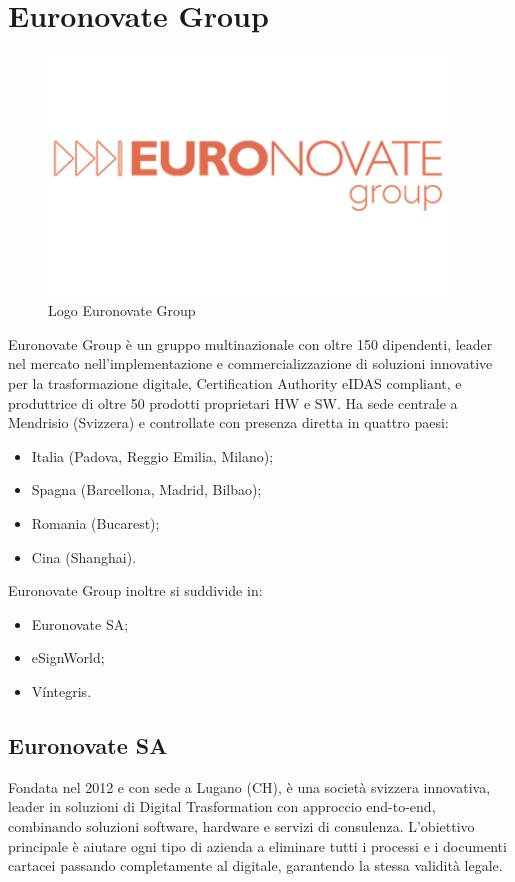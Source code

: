 \section{Euronovate Group}
\begin{figure}[!h] 
    \centering 
    \includegraphics[width=300pt]{images/euronovateGroupLogo.png} 
    \caption{Logo Euronovate Group}
    \label{fig:euronovateLogo}
\end{figure}
Euronovate Group è un gruppo multinazionale con oltre 150 dipendenti, leader nel mercato
nell'implementazione e commercializzazione di soluzioni innovative per la trasformazione digitale,
Certification Authority eIDAS compliant, e produttrice di oltre 50 prodotti proprietari HW e
SW.
Ha sede centrale a Mendrisio (Svizzera) e controllate con presenza diretta in quattro paesi:
\begin{itemize}
    \item Italia (Padova, Reggio Emilia, Milano);
    \item Spagna (Barcellona, Madrid, Bilbao);
    \item Romania (Bucarest);
    \item Cina (Shanghai).
\end{itemize}
Euronovate Group inoltre si suddivide in:
\begin{itemize}
    \item Euronovate SA;
    \item eSignWorld;
    \item Víntegris.
\end{itemize}

\subsection{Euronovate SA}
Fondata nel 2012 e con sede a Lugano (CH), è una società svizzera innovativa, leader in soluzioni
di Digital Trasformation con approccio end-to-end, combinando soluzioni software, hardware
e servizi di consulenza.
L'obiettivo principale è aiutare ogni tipo di azienda a eliminare tutti i processi e i documenti
cartacei passando completamente al digitale, garantendo la stessa validità legale.
